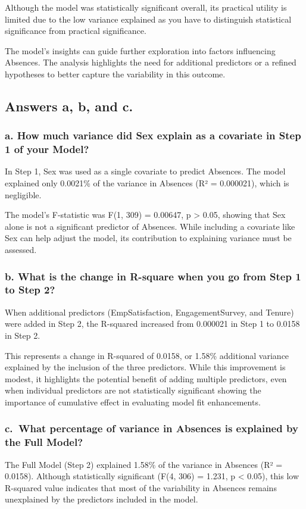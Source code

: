 \documentclass[
]{article}
\begin{document}
Although the model was statistically significant overall, its practical
utility is limited due to the low variance explained as you have to
distinguish statistical significance from practical significance.

The model's insights can guide further exploration into factors
influencing Absences. The analysis highlights the need for additional
predictors or a refined hypotheses to better capture the variability in
this outcome.

\subsection{Answers a, b, and c.}\label{answers-a-b-and-c.-3}

\subsubsection{a. How much variance did Sex explain as a covariate in
Step 1 of your
Model?}\label{a.-how-much-variance-did-sex-explain-as-a-covariate-in-step-1-of-your-model}

In Step 1, Sex was used as a single covariate to predict Absences. The
model explained only 0.0021\% of the variance in Absences (R² =
0.000021), which is negligible.

The model's F-statistic was F(1, 309) = 0.00647, p \textgreater{} 0.05,
showing that Sex alone is not a significant predictor of Absences. While
including a covariate like Sex can help adjust the model, its
contribution to explaining variance must be assessed.

\subsubsection{b. What is the change in R-square when you go from Step 1
to Step
2?}\label{b.-what-is-the-change-in-r-square-when-you-go-from-step-1-to-step-2-1}

When additional predictors (EmpSatisfaction, EngagementSurvey, and
Tenure) were added in Step 2, the R-squared increased from 0.000021 in
Step 1 to 0.0158 in Step 2.

This represents a change in R-squared of 0.0158, or 1.58\% additional
variance explained by the inclusion of the three predictors. While this
improvement is modest, it highlights the potential benefit of adding
multiple predictors, even when individual predictors are not
statistically significant showing the importance of cumulative effect in
evaluating model fit enhancements.

\subsubsection{c.~What percentage of variance in Absences is explained
by the Full
Model?}\label{c.-what-percentage-of-variance-in-absences-is-explained-by-the-full-model}

The Full Model (Step 2) explained 1.58\% of the variance in Absences (R²
= 0.0158). Although statistically significant (F(4, 306) = 1.231, p
\textless{} 0.05), this low R-squared value indicates that most of the
variability in Absences remains unexplained by the predictors included
in the model.
\end{document}
